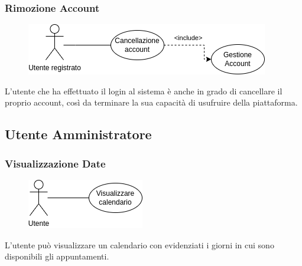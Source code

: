 \documentclass{article}
\begin{document}
\subsubsection{Rimozione Account}\label{rf_9}
\begin{description}
	
	\begin{figure}[htp]
		\centering
		\includegraphics[]{rf9.png}
	\end{figure}
	
	\item L'utente che ha effettuato il login al sistema è anche in grado di cancellare il proprio account, così da terminare la sua capacità di usufruire della piattaforma.
\end{description}

\clearpage

\subsection{Utente Amministratore}

\renewcommand\thesubsubsection{RF \arabic{subsubsection}}
\subsubsection{Visualizzazione Date}\label{rf_1}
\begin{description}
	    
	\begin{figure}[htp]
		\centering
		\includegraphics[]{rf1.png}
	\end{figure}
	    
	\item L'utente può visualizzare un calendario con evidenziati i giorni in cui sono disponibili gli appuntamenti. 
\end{description}

\renewcommand\thesubsubsection{RF 3}
\end{document}
